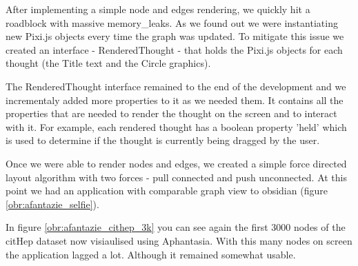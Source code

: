 After implementing a simple node and edges rendering, we quickly hit a roadblock with massive \glspl{memory_leak}.
As we found out we were instantiating new Pixi.js objects every time the graph was updated.
To mitigate this issue we created an interface - RenderedThought - that holds the Pixi.js objects for each thought (the Title text and the Circle graphics).

The RenderedThought interface remained to the end of the development and we incrementaly added more properties to it as we needed them.
It contains all the properties that are needed to render the thought on the screen and to interact with it.
For example, each rendered thought has a boolean property 'held' which is used to determine if the thought is currently being dragged by the user.

Once we were able to render nodes and edges, we created a simple force directed layout algorithm with two forces - pull connected and push unconnected.
At this point we had an application with comparable graph view to obsidian (figure \ref{obr:afantazie_selfie}).

In figure \ref{obr:afantazie_cithep_3k} you can see again the first 3000 nodes of the citHep dataset now visiaulised using Aphantasia.
With this many nodes on screen the application lagged a lot. Although it remained somewhat usable.

